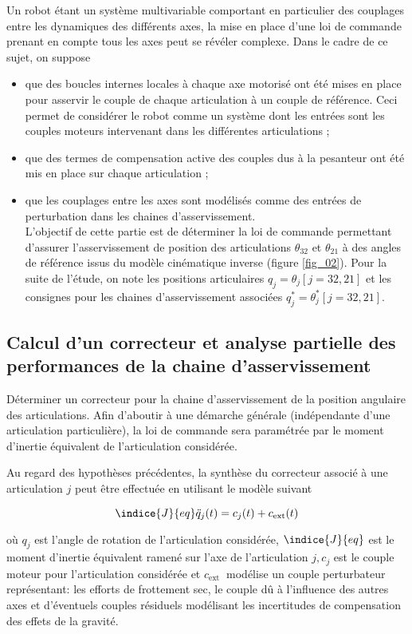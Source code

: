 Un robot étant un système multivariable comportant en particulier des couplages entre les dynamiques des différents axes, la mise en place d'une loi de commande prenant en compte tous les axes peut se révéler complexe. Dans le cadre de ce sujet, on suppose

\begin{itemize}
  \item que des boucles internes locales à chaque axe motorisé ont été mises en place pour asservir le couple de chaque articulation à un couple de référence. Ceci permet de considérer le robot comme un système dont les entrées sont les couples moteurs intervenant dans les différentes articulations ;
  \item que des termes de compensation active des couples dus à la pesanteur ont été mis en place sur chaque articulation ;
  \item que les couplages entre les axes sont modélisés comme des entrées de perturbation dans les chaines d'asservissement.\\
L'objectif de cette partie est de déterminer la loi de commande permettant d'assurer l'asservissement de position des articulations $\theta_{32}$ et $\theta_{21}$ à des angles de référence issus du modèle cinématique inverse (figure \ref{fig_02}). Pour la suite de l'étude, on note les positions articulaires $q_{j}=\theta_{j}[j=32,21]$ et les consignes pour les chaines d'asservissement associées $q_{j}^{*}=\theta_{j}^{*}[j=32,21]$.
\end{itemize}

\subsection{Calcul d'un correcteur et analyse partielle des performances de la chaine d'asservissement}
\begin{obj}
Déterminer un correcteur pour la chaine d'asservissement de la position angulaire des articulations. Afin d'aboutir à une démarche générale (indépendante d'une articulation particulière), la loi de commande sera paramétrée par le moment d'inertie équivalent de l'articulation considérée.
\end{obj}

Au regard des hypothèses précédentes, la synthèse du correcteur associé à une articulation $j$ peut être effectuée en utilisant le modèle suivant

$$
\indice{J}{eq} \ddot{q}_{j}(t)=c_{j}(t)+c_{\mathrm{ext}}(t)
$$

où $q_{j}$ est l'angle de rotation de l'articulation considérée, $\indice{J}{eq}$ est le moment d'inertie équivalent ramené sur l'axe de l'articulation $j, c_{j}$ est le couple moteur pour l'articulation considérée et $c_{\text {ext }}$ modélise un couple perturbateur représentant: les efforts de frottement sec, le couple dû à l'influence des autres axes et d'éventuels couples résiduels modélisant les incertitudes de compensation des effets de la gravité.

